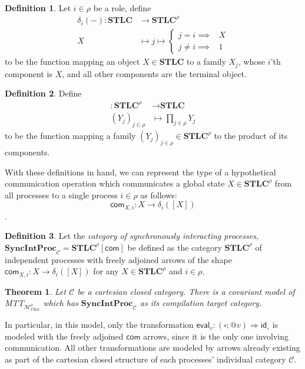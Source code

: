 \documentclass{scrartcl}
\theoremstyle{definition}
\newtheorem{definition}{Definition}
\theoremstyle{plain}
\newtheorem{theorem}{Theorem}
\begin{document}
\begin{definition}
  Let $i\in\rho$ be a role, define
  \begin{align*}
    \delta_i({-}) : \textbf{STLC} &\to \textbf{STLC}^\rho \\
    X &\mapsto j \mapsto \begin{cases}j = i \implies &X\\j \neq i \implies &1 \end{cases}
  \end{align*}
  to be the function mapping an object $X \in \textbf{STLC}$ to a family
  $X_j$, whose $i$'th component is $X$, and all other components are the
  terminal object.
\end{definition}

\begin{definition} Define
  \begin{align*}
    [{-}] : \textbf{STLC}^\rho &\to \textbf{STLC} \\
    (Y_j)_{j\in\rho} &\mapsto \prod_{j \in \rho} Y_j
  \end{align*}
  to be the function mapping a family $(Y_j)_{j\in\rho} \in \textbf{STLC}^\rho$
  to the product of its components.
\end{definition}

With these definitions in hand, we can represent the type of a hypothetical
communication operation which communicates a global state $X \in
\textbf{STLC}^\rho$ from all processes to a single process $i \in \rho$ as follows:
\[
  \textsf{com}_{X,i} : X \to \delta_i([X])
\].

\begin{definition}
  Let the \textit{category of synchronously interacting processes},
  $\textbf{SyncIntProc}_{\mathcal{C}} = \textbf{STLC}^\rho[\textsf{com}]$
  be defined as the category
  $\textbf{STLC}^\rho$ of independent processes with freely adjoined arrows of
  the shape $\textsf{com}_{X,i} : X \to \delta_i([X])$ for any $X \in
  \textbf{STLC}^\rho$ and $i \in \rho$.
\end{definition}

\begin{theorem}
  Let $\mathcal{C}$ be a cartesian closed category. There is a covariant model
  of MTT${}_{\mathcal{M}^\rho_{\textrm{Chor}}}$ which has
  $\textbf{SyncIntProc}_{\mathcal{C}}$ as its compilation target category.
\end{theorem}

In particular, in this model, only the transformation $\textsf{eval}_v : (\square ;
{}@ v) \Rightarrow \textsf{id}_\circ$ is modeled with the freely adjoined
$\textsf{com}$ arrows, since it is the only one involving communication. All
other transformations are modeled by arrows already existing as part of the
cartesian closed structure of each processes' individual category $\mathcal{C}$.







\end{document}
